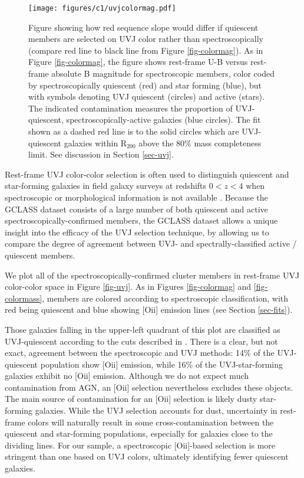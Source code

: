 \begin{figure*}
\centering \texttt{[image: figures/c1/uvjcolormag.pdf]}
\caption[Effect of \textit{UVJ} selection on inferred red-sequence properties]{
Figure showing how red sequence slope would differ if quiescent members are selected on UVJ color rather than spectroscopically (compare red line to black line from Figure \ref{fig-colormag}).
As in Figure \ref{fig-colormag}, the figure shows rest-frame U-B versus rest-frame absolute B magnitude for spectroscopic members, color coded by spectroscopically quiescent (red) and star forming (blue), but with symbols denoting UVJ quiescent (circles) and active (stars).  The indicated contamination measures the proportion of UVJ-quiescent, spectroscopically-active galaxies (blue circles).
The fit shown as a dashed red line is to the solid circles which are UVJ-quiescent galaxies within R$_{200}$ above the 80\% mass completeness limit. See discussion in Section \ref{sec-uvj}.
\label{fig-uvjcolormag}}
\end{figure*}

Rest-frame UVJ color-color selection is often used to distinguish quiescent and star-forming galaxies in field galaxy surveys at redshifts $0 < z < 4$ when spectroscopic or morphological information is not available \citep{Wuyts:2007aa,Williams:2009tt,Whitaker:2011aa,Patel:2012ab,van-der-Burg:2013zn,Whitaker:2013rz,muzzin2013,Strazzullo:2013aa}.
Because the GCLASS dataset consists of a large number of both quiescent and active spectroscopically-confirmed members, the GCLASS dataset allows a unique insight into the efficacy of the UVJ selection technique, by allowing us to compare the degree of agreement between UVJ- and spectrally-classified active / quiescent members.

We plot all of the spectroscopically-confirmed cluster members in rest-frame UVJ color-color space in Figure \ref{fig-uvj}.
As in Figures \ref{fig-colormag} and \ref{fig-colormass}, members are colored according to spectroscopic classification, with red being quiescent and blue showing [O{\sc ii}] emission lines (see Section \ref{sec-fits}).

Those galaxies falling in the upper-left quadrant of this plot are classified as UVJ-quiescent according to the cuts described in \citet{Williams:2009tt}. There is a clear, but not exact, agreement between the spectroscopic and UVJ methods: 14\% of the UVJ-quiescent population show [O{\sc ii}] emission, while 16\% of the UVJ-star-forming galaxies exhibit no [O{\sc ii}] emission. Although we do not expect much contamination from AGN, an [O{\sc ii}] selection nevertheless excludes these objects. The main source of contamination for an [O{\sc ii}] selection is likely dusty star-forming galaxies. While the UVJ selection accounts for dust, uncertainty in rest-frame colors will naturally result in some cross-contamination between the quiescent and star-forming populations, especially for galaxies close to the dividing lines. For our sample, a spectroscopic [O{\sc ii}]-based selection is more stringent than one based on UVJ colors, ultimately identifying fewer quiescent galaxies.

